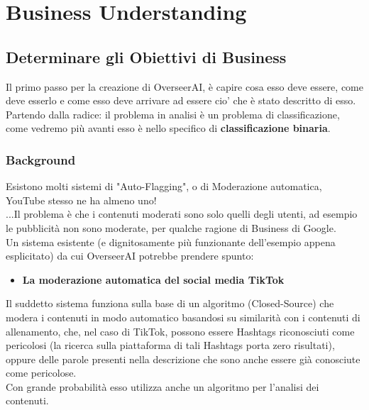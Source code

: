 \documentclass[a4paper,12pt]{report}
\begin{document}
\newpage

\begingroup%
\makeatletter%
\let\clearpage\relax%
\vspace*{\fill}%
\vspace*{\dimexpr-50\p@-\baselineskip}%
\chapter{Business Understanding}
\vspace*{\fill}%
\endgroup
\newpage

\section{Determinare gli Obiettivi di Business}
Il primo passo per la creazione di OverseerAI, è capire cosa esso deve essere, come deve esserlo e come esso deve arrivare ad essere cio' che è stato descritto di esso.\\
Partendo dalla radice: il problema in analisi è un problema di classificazione, come vedremo più avanti esso è nello specifico di \textbf{classificazione binaria}.
\subsection{Background}
Esistono molti sistemi di "Auto-Flagging", o di Moderazione automatica, YouTube stesso ne ha almeno uno!\\
...Il problema è che i contenuti moderati sono solo quelli degli utenti, ad esempio le pubblicità non sono moderate, per qualche ragione di Business di Google.\\
Un sistema esistente (e dignitosamente più funzionante dell'esempio appena esplicitato) da cui OverseerAI potrebbe prendere spunto:
\begin{itemize}
    \item \textbf{La moderazione automatica del social media TikTok} 
\end{itemize}
Il suddetto sistema funziona sulla base di un algoritmo (Closed-Source) che modera i contenuti in modo automatico basandosi su similarità con i contenuti di allenamento, che, nel caso di TikTok, possono essere Hashtags riconosciuti come pericolosi (la ricerca sulla piattaforma di tali Hashtags porta zero risultati), oppure delle parole presenti nella descrizione che sono anche essere già conosciute come pericolose.\\
Con grande probabilità esso utilizza anche un algoritmo per l'analisi dei contenuti.
\end{document}
